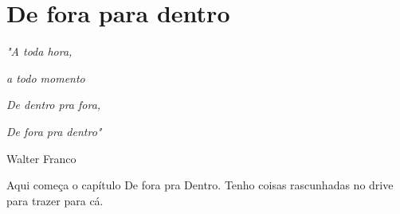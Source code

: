 \chapter{De fora para dentro}

\singlespacing
\begin{flushright}
\textit{"A toda hora,}

\textit{a todo momento}

\textit{De dentro pra fora,}

\textit{De fora pra dentro"}

Walter Franco
\end{flushright}
\doublespacing

Aqui começa o capítulo De fora pra Dentro.  Tenho coisas rascunhadas no drive para trazer para cá.





